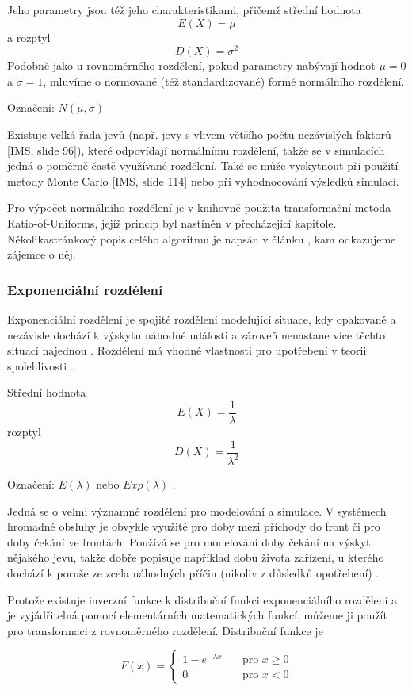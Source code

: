 \documentclass[a4paper,11pt]{article}
\begin{document}
Jeho parametry jsou též jeho charakteristikami, přičemž střední hodnota $$E(X) = \mu$$ a rozptyl $$D(X) = \sigma^2$$Podobně jako u rovnoměrného rozdělení, pokud parametry nabývají hodnot $\mu = 0$ a $\sigma=1$, mluvíme o normované (též standardizované) formě normálního rozdělení. \cite{INM}

Označení: $N(\mu, \sigma)$

Existuje velká řada jevů (např. jevy s vlivem většího počtu nezávislých faktorů [IMS, slide 96]), které odpovídají normálnímu rozdělení, takže se v simulacích jedná o poměrně častě využívané rozdělení. Také se může vyskytnout při použití metody Monte Carlo [IMS, slide 114] nebo při vyhodnocování výsledků simulací.

Pro výpočet normálního rozdělení je v knihovně použita transformační metoda Ratio-of-Uniforms, jejíž princip byl nastíněn v přecházející kapitole. Několikastránkový popis celého algoritmu je napsán v článku \cite{Leva}, kam odkazujeme zájemce o něj.

\subsubsection{Exponenciální rozdělení}

Exponenciální rozdělení je spojité rozdělení modelující situace, kdy opakovaně a nezávisle dochází k výskytu náhodné události a zároveň nenastane více těchto situací najednou \cite{INM}. Rozdělení má vhodné vlastnosti pro upotřebení v teorii spolehlivosti \cite{IASTAT}.

Střední hodnota $$E(X) = \frac{1}{\lambda}$$ rozptyl $$D(X)  =\frac{1}{\lambda^2}$$

Označení: $E(\lambda)$ nebo $Exp(\lambda)$ \cite{INM}.

Jedná se o velmi významné rozdělení pro modelování a simulace. V systémech hromadné obsluhy je  obvykle využité pro doby mezi příchody do front či pro doby čekání ve frontách. Používá se pro modelování doby čekání na výskyt nějakého jevu, takže dobře popisuje například dobu života zařízení, u kterého dochází k poruše ze zcela náhodných příčin (nikoliv z důsledků opotřebení) \cite{IASTAT}.

Protože existuje inverzní funkce k distribuční funkci exponenciálního rozdělení a je vyjádřitelná pomocí elementárních matematických funkcí, můžeme ji použít pro transformaci z rovnoměrného rozdělení. Distribuční funkce je 

$$
{F(x)} = \left\{
\begin{array}{ll}
 1 - e ^{-\lambda x} & \quad\text{pro } x \geq 0  \\
 0 & \quad\text{pro } x < 0
\end{array}
\right.
$$
\end{document}
